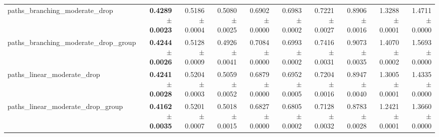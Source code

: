 \begin{tabular}{@{}lrrrrrrrrr@{}}
paths\_branching\_moderate\_drop & \textbf{0.4289 $\pm$ 0.0023} & 0.5186 $\pm$ 0.0004 & 0.5080 $\pm$ 0.0025 & 0.6902 $\pm$ 0.0000 & 0.6983 $\pm$ 0.0002 & 0.7221 $\pm$ 0.0027 & 0.8906 $\pm$ 0.0016 & 1.3288 $\pm$ 0.0001 & 1.4711 $\pm$ 0.0000 \\
paths\_branching\_moderate\_drop\_group & \textbf{0.4244 $\pm$ 0.0026} & 0.5128 $\pm$ 0.0009 & 0.4926 $\pm$ 0.0041 & 0.7084 $\pm$ 0.0000 & 0.6993 $\pm$ 0.0002 & 0.7416 $\pm$ 0.0031 & 0.9073 $\pm$ 0.0035 & 1.4070 $\pm$ 0.0002 & 1.5693 $\pm$ 0.0000 \\
paths\_linear\_moderate\_drop & \textbf{0.4241 $\pm$ 0.0028} & 0.5204 $\pm$ 0.0003 & 0.5059 $\pm$ 0.0052 & 0.6879 $\pm$ 0.0000 & 0.6952 $\pm$ 0.0005 & 0.7204 $\pm$ 0.0016 & 0.8947 $\pm$ 0.0040 & 1.3005 $\pm$ 0.0001 & 1.4335 $\pm$ 0.0000 \\
paths\_linear\_moderate\_drop\_group & \textbf{0.4162 $\pm$ 0.0035} & 0.5201 $\pm$ 0.0007 & 0.5018 $\pm$ 0.0015 & 0.6827 $\pm$ 0.0000 & 0.6805 $\pm$ 0.0002 & 0.7128 $\pm$ 0.0032 & 0.8783 $\pm$ 0.0028 & 1.2421 $\pm$ 0.0001 & 1.3660 $\pm$ 0.0000 \\
\bottomrule
\end{tabular}
